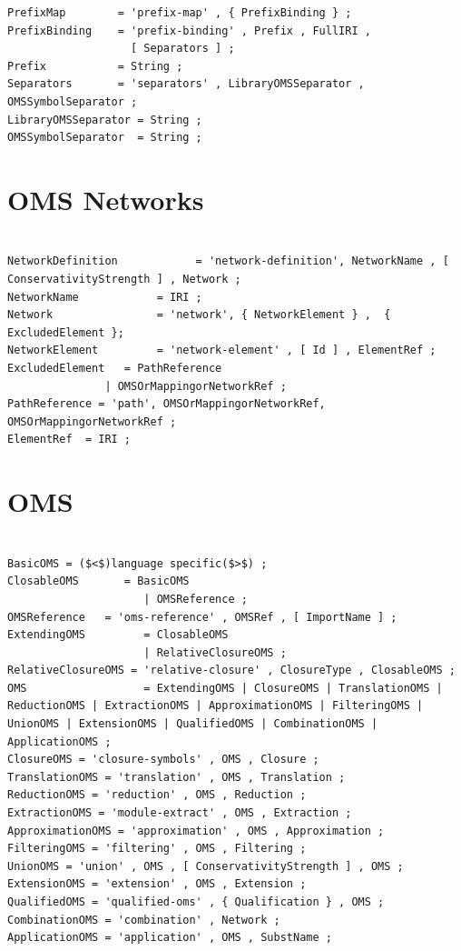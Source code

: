 \documentclass[10pt,fleqn,final]{scrreprt}
\makeatletter
\newcommand*{\eg}{e.g.\@\xspace}
\newcommand*\CommentAuthor{}
\renewcommand*\CommentAuthor{#1}}
\newcommand*\CommentDate{}
\renewcommand*\CommentDate{#1}}
\newcommand*\CommentId{}
\renewcommand*\CommentId{#1}}
\newcommand*\CommentType{}
\renewcommand*\CommentType{#1}}
\newcommand*{\SetCommentColorByType}[1]{%
\edef\localType{{#1}}%
\expandafter\ifstrequal\localType{q-aut}{\colorlet{CommentColor}{red}}{%
\expandafter\ifstrequal\localType{q-all}{\colorlet{CommentColor}{orange}}{%
\expandafter\ifstrequal\localType{todo}{\colorlet{CommentColor}{orange}}{%
\expandafter\ifstrequal\localType{fyi}{\colorlet{CommentColor}{lightgray}}{%
\colorlet{CommentColor}{yellow}}}}}}
\newcommand*{\SetCommentPrefixByType}[1]{%
\edef\localType{{#1}}%
\expandafter\@ifmtarg\localType{%
\edef\CommentPrefix{}%
}{%
\caseupper[q]{#1}%
\edef\CommentPrefix{\thestring: }%
}}
\newcommand*{\initComment}[1]{%
\setkeys{Comment}{#1}%
\SetCommentColorByType{\CommentType}%
\relax%
\SetCommentPrefixByType{\CommentType}%
\relax%
}
\newcommand*{\todonote}[2][]{%
\initComment{#1}%
\pdfcomment[author=\CommentAuthor,color=CommentColor,date=\CommentDate,id=\CommentId]{%
\CommentPrefix
#2}}
\renewcommand*{\todonote}[2][]{%
\initComment{#1}%
\ednote{\CommentPrefix #2}}
\renewcommand*{\textLF}{\\}
\newcommand{\sclause}[1]{\section{#1}}
\newenvironment{definitions}[0]{\medskip }{}
\makeatother
\begin{document}
\begin{definitions}
\begin{lstlisting}[language=ebnf,escapeinside={()}]
PrefixMap        = 'prefix-map' , { PrefixBinding } ;
PrefixBinding    = 'prefix-binding' , Prefix , FullIRI ,
                   [ Separators ] ;
Prefix           = String ;
Separators       = 'separators' , LibraryOMSSeparator , OMSSymbolSeparator ;
LibraryOMSSeparator = String ;
OMSSymbolSeparator  = String ;
\end{lstlisting}


\sclause{OMS Networks}\label{a:networks}
\begin{lstlisting}[language=ebnf,escapeinside={()}]  % abstract syntax

NetworkDefinition            = 'network-definition', NetworkName , [ ConservativityStrength ] , Network ;
NetworkName            = IRI ;
Network                = 'network', { NetworkElement } ,  { ExcludedElement };
NetworkElement         = 'network-element' , [ Id ] , ElementRef ;
ExcludedElement   = PathReference
               | OMSOrMappingorNetworkRef ;
PathReference = 'path', OMSOrMappingorNetworkRef, OMSOrMappingorNetworkRef ;
ElementRef  = IRI ;
\end{lstlisting}


\sclause{OMS}

\begin{lstlisting}[language=ebnf,escapeinside={()}]  % abstract syntax

BasicOMS = ($<$)language specific($>$) ;
ClosableOMS       = BasicOMS
                     | OMSReference ;
OMSReference   = 'oms-reference' , OMSRef , [ ImportName ] ;
ExtendingOMS         = ClosableOMS
                     | RelativeClosureOMS ;
RelativeClosureOMS = 'relative-closure' , ClosureType , ClosableOMS ;
OMS                  = ExtendingOMS | ClosureOMS | TranslationOMS | ReductionOMS | ExtractionOMS | ApproximationOMS | FilteringOMS | UnionOMS | ExtensionOMS | QualifiedOMS | CombinationOMS | ApplicationOMS ;
ClosureOMS = 'closure-symbols' , OMS , Closure ;
TranslationOMS = 'translation' , OMS , Translation ;
ReductionOMS = 'reduction' , OMS , Reduction ;
ExtractionOMS = 'module-extract' , OMS , Extraction ;
ApproximationOMS = 'approximation' , OMS , Approximation ;
FilteringOMS = 'filtering' , OMS , Filtering ;
UnionOMS = 'union' , OMS , [ ConservativityStrength ] , OMS ;
ExtensionOMS = 'extension' , OMS , Extension ;
QualifiedOMS = 'qualified-oms' , { Qualification } , OMS ;
CombinationOMS = 'combination' , Network ;
ApplicationOMS = 'application' , OMS , SubstName ;


\end{lstlisting}
\end{definitions}
\end{document}
